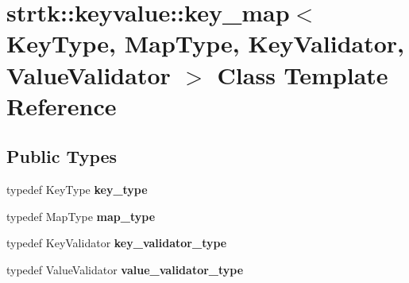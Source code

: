 \hypertarget{classstrtk_1_1keyvalue_1_1key__map}{\section{strtk\-:\-:keyvalue\-:\-:key\-\_\-map$<$ Key\-Type, Map\-Type, Key\-Validator, Value\-Validator $>$ Class Template Reference}
\label{classstrtk_1_1keyvalue_1_1key__map}
}
\subsection*{Public Types}
\begin{DoxyCompactItemize}
\item 
\hypertarget{classstrtk_1_1keyvalue_1_1key__map_a3a53e286dc7cb9d6b43d3d969636b0fa}{typedef Key\-Type {\bfseries key\-\_\-type}}\label{classstrtk_1_1keyvalue_1_1key__map_a3a53e286dc7cb9d6b43d3d969636b0fa}

\item 
\hypertarget{classstrtk_1_1keyvalue_1_1key__map_a54cf432f4cc6de3c1e0a1dbcc00df087}{typedef Map\-Type {\bfseries map\-\_\-type}}\label{classstrtk_1_1keyvalue_1_1key__map_a54cf432f4cc6de3c1e0a1dbcc00df087}

\item 
\hypertarget{classstrtk_1_1keyvalue_1_1key__map_a317c50ec3b5c71e010870dbd6cba3714}{typedef Key\-Validator {\bfseries key\-\_\-validator\-\_\-type}}\label{classstrtk_1_1keyvalue_1_1key__map_a317c50ec3b5c71e010870dbd6cba3714}

\item 
\hypertarget{classstrtk_1_1keyvalue_1_1key__map_a25d72fd579a42850fd9e97a6e847a408}{typedef Value\-Validator {\bfseries value\-\_\-validator\-\_\-type}}\label{classstrtk_1_1keyvalue_1_1key__map_a25d72fd579a42850fd9e97a6e847a408}

\end{DoxyCompactItemize}
